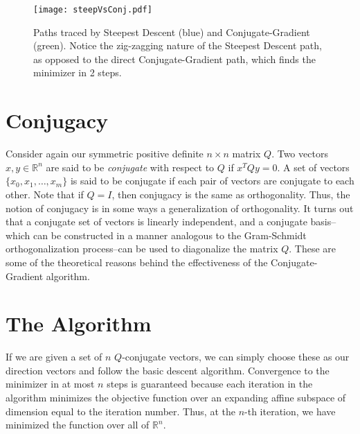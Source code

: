 \begin{figure}
\centering
\texttt{[image: steepVsConj.pdf]}
\caption{Paths traced by Steepest Descent (blue) and Conjugate-Gradient (green). Notice the
zig-zagging nature of the Steepest Descent path, as opposed to the direct Conjugate-Gradient path,
which finds the minimizer in 2 steps.}
\label{basis:steepVsConj}
\end{figure}

\section*{Conjugacy}
Consider again our symmetric positive definite $n \times n$ matrix $Q$. Two vectors $x, y \in \mathbb{R}^n$ are said to be \emph{conjugate}
with respect to $Q$ if $x^TQy = 0$. A set of vectors $\{x_0, x_1, \ldots, x_m\}$ is said to be conjugate if each pair of vectors are conjugate
to each other. Note that if $Q = I$, then conjugacy is the same as orthogonality. Thus, the notion of conjugacy is in some ways a generalization
of orthogonality. It turns out that a conjugate set of vectors is linearly independent, and a conjugate basis--which can be constructed in a manner
analogous to the Gram-Schmidt orthogonalization process--can be used to diagonalize the matrix $Q$.
These are some of the theoretical reasons behind the effectiveness of the Conjugate-Gradient algorithm.

\section*{The Algorithm}
If we are given a set of $n$ $Q$-conjugate vectors, we can simply choose these as our direction vectors and follow the basic descent algorithm.
Convergence to the minimizer in at most $n$ steps is guaranteed because each iteration in the algorithm minimizes the objective function
over an expanding affine subspace of dimension equal to the iteration number. Thus, at the $n$-th iteration, we have minimized the function over all of
$\mathbb{R}^n$.

